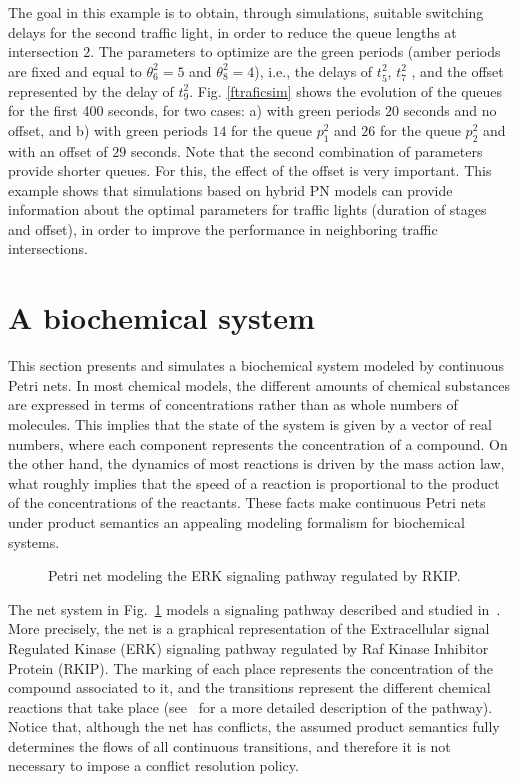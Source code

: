 The goal in this example is to obtain, through simulations, suitable
switching delays for the second traffic light, in order to reduce
the queue lengths at intersection $2$. The parameters to optimize
are the green periods (amber periods are fixed and equal to
$\theta_{6}^2=5$ and $\theta_{8}^2=4$), i.e., the delays of $t_5^2$,
$t_7^2$ , and the offset represented by the delay of $t_9^2$. Fig.
\ref{ftraficsim} shows the evolution of the queues for the first 400
seconds, for two cases: a) with green periods $20$ seconds
and no offset, and b) with green periods $14$ for the queue $p_1^2$
and $26$ for the queue $p_2^2$ and with an offset of $29$ seconds.
Note that the second combination of parameters provide shorter
queues. For this, the effect of the offset is very important. This
example shows that simulations based on hybrid PN models can provide
information about the optimal parameters for traffic lights
(duration of stages and offset), in order to improve the performance
in neighboring traffic intersections.


\section{A biochemical system}
\label{s:pathway}

This section presents and simulates a biochemical system modeled by continuous
Petri nets. In most chemical models, the different amounts of chemical substances are expressed
in terms of concentrations rather than as whole numbers of molecules. This implies
that the state of the system is given by a vector of real numbers, where each component
represents the concentration of a compound.
On the other hand, the dynamics
of most reactions is driven by the mass action law, what roughly implies that the
speed of a reaction is proportional to the product of the concentrations of the
reactants. These facts make continuous Petri nets under product semantics an
appealing modeling formalism for biochemical systems.

\begin{figure}
   \caption{Petri net modeling the ERK signaling pathway regulated by RKIP.}
   \label{f:bioches}
\end{figure}

The net system in Fig.~\ref{f:bioches} models a signaling pathway described and
studied in~\cite{IPChShKi03}. More precisely, the net is a graphical representation
of the Extracellular signal Regulated Kinase (ERK) signaling pathway regulated by
Raf Kinase Inhibitor Protein (RKIP). The marking of each place represents the concentration
of the compound associated to it, and the transitions represent the different
chemical reactions that take place (see~\cite{IPChShKi03} for a more detailed
description of the pathway). Notice that, although the net has conflicts, the assumed 
product semantics fully determines the flows of all continuous transitions,
and therefore it is not necessary to impose a conflict resolution policy.

